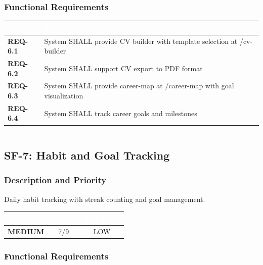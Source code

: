 \documentclass[12pt,a4paper]{article}
\begin{document}
\subsubsection{Functional Requirements}

\vspace{0.3em}
\begin{center}
\begin{tabular}{|l|p{11cm}|}
\hline
\rowcolor{deepblue}
\textcolor{white}{\textbf{Req ID}} & \textcolor{white}{\textbf{Requirement Specification}} \\
\hline
\rowcolor{lightgray}
\textbf{REQ-6.1} & System SHALL provide CV builder with template selection at /cv-builder \\
\hline
\textbf{REQ-6.2} & System SHALL support CV export to PDF format \\
\hline
\rowcolor{lightgray}
\textbf{REQ-6.3} & System SHALL provide career-map at /career-map with goal visualization \\
\hline
\textbf{REQ-6.4} & System SHALL track career goals and milestones \\
\hline
\end{tabular}
\end{center}

\vspace{1em}
\hrule

\subsection{SF-7: Habit and Goal Tracking}

\subsubsection{Description and Priority}
Daily habit tracking with streak counting and goal management.

\vspace{0.3em}
\begin{center}
\begin{tabular}{|c|c|c|}
\hline
\rowcolor{accentblue}
\textcolor{white}{\textbf{Priority}} & \textcolor{white}{\textbf{Impact}} & \textcolor{white}{\textbf{Risk Level}} \\
\hline
\rowcolor{lightgray}
\textbf{\textcolor{accentblue}{MEDIUM}} & 7/9 & LOW \\
\hline
\end{tabular}
\end{center}

\subsubsection{Functional Requirements}
\end{document}
